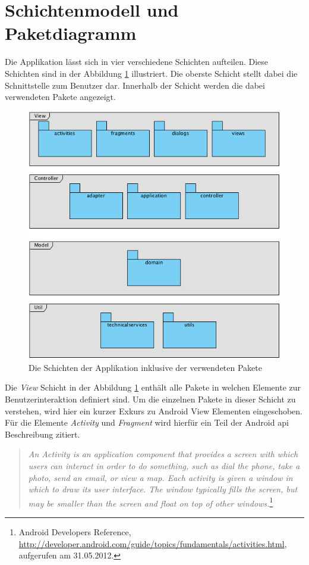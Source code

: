 \newpage

\section{Schichtenmodell und Paketdiagramm}
Die Applikation lässt sich in vier verschiedene Schichten aufteilen. Diese Schichten sind in der Abbildung \ref{fig:layer} illustriert. Die oberste Schicht stellt dabei die Schnittstelle zum Benutzer dar. Innerhalb der Schicht werden die dabei verwendeten Pakete angezeigt.  
\begin{figure}[h!]
\caption{Die Schichten der Applikation inklusive der verwendeten Pakete}
\label{fig:layer}
\centering
\includegraphics[scale=0.9]{05bericht/images/packagediagram.png}
\end{figure} 

Die \textit{View} Schicht in der Abbildung \ref{fig:layer} enthält alle Pakete in welchen Elemente zur Benutzerinteraktion definiert sind. Um die einzelnen Pakete in dieser Schicht zu verstehen, wird hier ein kurzer Exkurs zu Android View Elementen eingeschoben. Für die Elemente \textit{Activity} und \textit{Fragment} wird hierfür ein Teil der Android \gls{api} Beschreibung zitiert.

\begin{quote}
\textit{An Activity is an application component that provides a screen with which users can interact in order to do something, such as dial the phone, take a photo, send an email, or view a map. Each activity is given a window in which to draw its user interface. The window typically fills the screen, but may be smaller than the screen and float on top of other windows.}\footnote{Android Developers Reference, \url{http://developer.android.com/guide/topics/fundamentals/activities.html}, aufgerufen am 31.05.2012.}
\end{quote}

